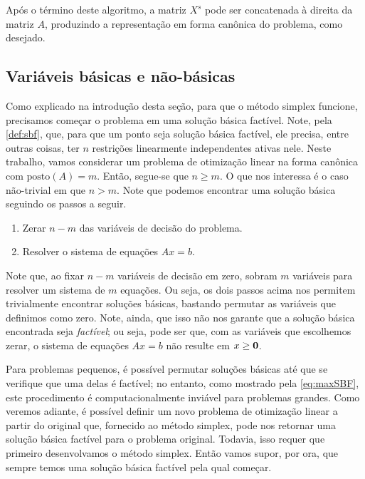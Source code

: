 Após o término deste algoritmo, a matriz $ X^s$ pode ser concatenada à direita da matriz $ A$, produzindo a representação em forma canônica do problema, como desejado.

\subsection{Variáveis básicas e não-básicas}\label{sec: x_B e  x_N}

Como explicado na introdução desta seção, para que o método simplex funcione, precisamos começar o problema em uma solução básica factível. Note, pela \cref{def:sbf}, que, para que um ponto seja solução básica factível, ele precisa, entre outras coisas, ter $n$ restrições linearmente independentes ativas nele. Neste trabalho, vamos considerar um problema de otimização linear na forma canônica com $\text{posto}( A) = m$. Então, segue-se que $n \geq m$. O que nos interessa é o caso não-trivial em que $n > m$. Note que podemos encontrar uma solução básica seguindo os passos a seguir.

\begin{enumerate}
    \item Zerar $n - m$ das variáveis de decisão do problema.
    \item Resolver o sistema de equações $Ax = b$.
\end{enumerate}

Note que, ao fixar $n - m$ variáveis de decisão em zero, sobram $m$ variáveis para resolver um sistema de $m$ equações. Ou seja, os dois passos acima nos permitem trivialmente encontrar soluções básicas, bastando permutar as variáveis que definimos como zero. Note, ainda, que isso não nos garante que a solução básica encontrada seja \emph{factível}; ou seja, pode ser que, com as variáveis que escolhemos zerar, o sistema de equações $Ax=b$ não resulte em $x \geq \vb 0$.

Para problemas pequenos, é possível permutar soluções básicas até que se verifique que uma delas é factível; no entanto, como mostrado pela \cref{eq:maxSBF}, este procedimento é computacionalmente inviável para problemas grandes. Como veremos adiante, é possível definir um novo problema de otimização linear a partir do original que, fornecido ao método simplex, pode nos retornar uma solução básica factível para o problema original. Todavia, isso requer que primeiro desenvolvamos o método simplex. Então vamos supor, por ora, que sempre temos uma solução básica factível pela qual começar.

